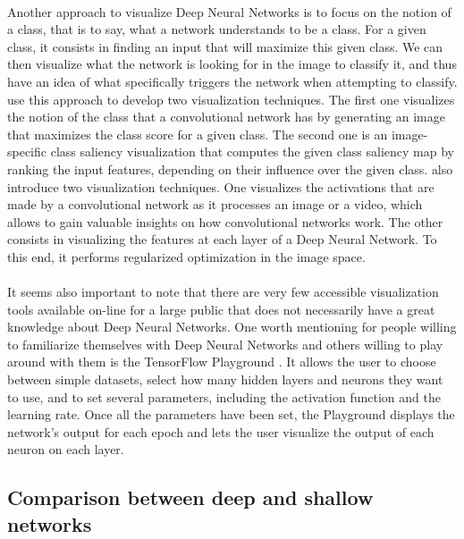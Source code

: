 \documentclass[a4paper]{article}
\begin{document}
\paragraph{}Another approach to visualize Deep Neural Networks is to focus on the notion of a class, that is to say, what a network understands to be a class. For a given class, it consists in finding an input that will maximize this given class. We can then visualize what the network is looking for in the image to classify it, and thus have an idea of what specifically triggers the network when attempting to classify. \citep{Simonyan2014} use this approach to develop two visualization techniques. The first one visualizes the notion of the class that a convolutional network has by generating an image that maximizes the class score for a given class. The second one is an image-specific class saliency visualization that computes the given class saliency map by ranking the input features, depending on their influence over the given class. \citep{Yosinski2015} also introduce two visualization techniques. One visualizes the activations that are made by a convolutional network as it processes an image or a video, which allows to gain valuable insights on how convolutional networks work. The other consists in visualizing the features at each layer of a Deep Neural Network. To this end, it performs regularized optimization in the image space.

\paragraph{}It seems also important to note that there are very few accessible visualization tools available on-line for a large public that does not necessarily have a great knowledge about Deep Neural Networks. One worth mentioning for people willing to familiarize themselves with Deep Neural Networks and others willing to play around with them is the TensorFlow Playground \citep{TFPlayground}. It allows the user to choose between simple datasets, select how many hidden layers and neurons they want to use, and to set several parameters, including the activation function and the learning rate. Once all the parameters have been set, the Playground displays the network's output for each epoch and lets the user visualize the output of each neuron on each layer.

\subsection{Comparison between deep and shallow networks}
\end{document}
